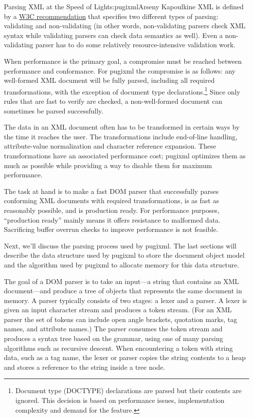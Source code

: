 \begin{aosachapter}{Parsing XML at the Speed of Light}{s:pugixml}{Arseny Kapoulkine}
XML is defined by a \href{http://www.w3.org/TR/REC-xml/}{W3C
recommendation} that specifies two different types of parsing:
validating and non-validating (in other words, non-validating parsers
check XML syntax while validating parsers can check data semantics as
well). Even a non-validating parser has to do some relatively
resource-intensive validation work.

When performance is the primary goal, a compromise must be reached
between performance and conformance. For pugixml the compromise is as
follows: any well-formed XML document will be fully parsed, including
all required transformations, with the exception of document type
declarations.\footnote{Document type (DOCTYPE) declarations are parsed
  but their contents are ignored. This decision is based on performance
  issues, implementation complexity and demand for the feature.} Since
only rules that are fast to verify are checked, a non-well-formed
document can sometimes be parsed successfully.

The data in an XML document often has to be transformed in certain ways
by the time it reaches the user. The transformations include end-of-line
handling, attribute-value normalization and character reference
expansion. These transformations have an associated performance cost;
pugixml optimizes them as much as possible while providing a way to
disable them for maximum performance.

The task at hand is to make a fast DOM parser that successfully parses
conforming XML documents with required transformations, is as fast as
reasonably possible, and is production ready. For performance purposes,
``production ready'' mainly means it offers resistance to malformed
data. Sacrificing buffer overrun checks to improve performance is not
feasible.

Next, we'll discuss the parsing process used by pugixml. The last
sections will describe the data structure used by pugixml to store the
document object model and the algorithm used by pugixml to allocate
memory for this data structure.


The goal of a DOM parser is to take an input---a string that contains an
XML document---and produce a tree of objects that represents the same
document in memory. A parser typically consists of two stages: a lexer
and a parser. A lexer is given an input character stream and produces a
token stream. (For an XML parser the set of tokens can include open
angle brackets, quotation marks, tag names, and attribute names.) The
parser consumes the token stream and produces a syntax tree based on the
grammar, using one of many parsing algorithms such as recursive descent.
When encountering a token with string data, such as a tag name, the
lexer or parser copies the string contents to a heap and stores a
reference to the string inside a tree node.


\end{aosachapter}
